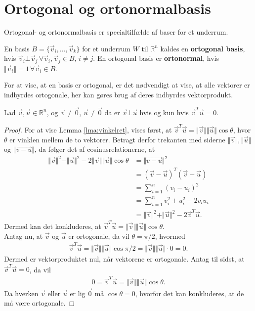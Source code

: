\section{Ortogonal og ortonormalbasis}
Ortogonal- og ortonormalbasis er specialtilfælde af baser for et underrum.
\begin{defn}
En basis $B = \{\vec{v}_i,..., \vec{v}_k\}$ for  et underrum $W$ til $\mathds{R}^n$ kaldes en \textbf{ortogonal basis}, hvis 
$\vec{v}_i \bot \vec{v}_j \, \forall \vec{v}_i, \vec{v}_j \in B, \, i \neq j$. En ortogonal basis er \textbf{ortonormal}, hvis $\Vert\vec{v}_i\Vert = 1 \, \forall \vec{v}_i \in B$.
\end{defn}
For at vise, at en basis er ortogonal, er det nødvendigt at vise, at alle vektorer er indbyrdes ortogonale, her kan gøres brug af deres indbyrdes vektorprodukt.
\begin{lma}
Lad $\vec{v}, \vec{u} \in \mathds{R}^n$, og $\vec{v}\neq \vec{0}$, $\vec{u} \neq \vec{0}$ da er $\vec{v} \bot \vec{u}$ hvis og kun hvis $\vec{v}^T\vec{u} = 0$.
\label{lma:vinkelret}
\end{lma}
\begin{proof}
For at vise Lemma \ref{lma:vinkelret}, vises først, at $\vec{v}^T\vec{u} = \Vert\vec{v}\Vert\Vert\vec{u}\Vert\cos{\theta}$, hvor $\theta$ er vinklen mellem de to vektorer. 
Betragt derfor trekanten med siderne $\Vert\vec{v}\Vert , \Vert\vec{u}\Vert$ og $\Vert\vec{v-u}\Vert$, da følger det af cosinusrelationerne, at 
\begin{align*}
\Vert\vec{v}\Vert^2 +  \Vert\vec{u}\Vert^2 - 2\Vert\vec{v}\Vert\Vert\vec{u}\Vert\cos{\theta} &= \Vert\vec{v-u}\Vert^2 
\\ &= (\vec{v}-\vec{u})^T(\vec{v}-\vec{u})
\\&= \sum_{i=1}^n (v_i- u_i)^2 
\\&= \sum_{i=1}^n v_i^2 + u_i^2 - 2 v_iu_i 
\\&= \Vert\vec{v}\Vert^2 +  \Vert\vec{u}\Vert^2 - 2\vec{v}^T\vec{u}.
\end{align*}
Dermed kan det konkluderes,  at $\vec{v}^T\vec{u} = \Vert\vec{v}\Vert\Vert\vec{u}\Vert\cos{\theta}$.
\\Antag nu, at $\vec{v}$ og $\vec{u}$ er ortogonale, da vil $\theta= \pi/2$, hvormed
\begin{align*}
\vec{v}^T\vec{u} = \Vert\vec{v}\Vert\Vert\vec{u}\Vert\cos{\pi/2}= \Vert\vec{v}\Vert\Vert\vec{u}\Vert\cdot0 = 0.
\end{align*}
Dermed er vektorproduktet nul, når vektorene er ortogonale.
Antag til sidst, at $\vec{v}^T\vec{u}=0$, da vil 
\begin{align*}
0 = \vec{v}^T\vec{u} = \Vert\vec{v}\Vert\Vert\vec{u}\Vert\cos{\theta}.
\end{align*}
Da hverken $\vec{v}$ eller $\vec{u}$ er lig $\vec{0}$ må $\cos{\theta} = 0 $, hvorfor det kan konkluderes, at de må være ortogonale.
\end{proof}
